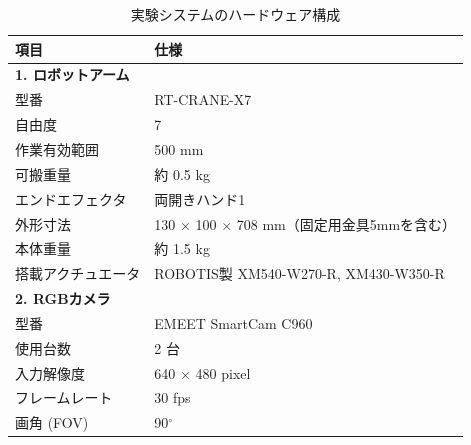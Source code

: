 \begin{table}[htbp]
    \centering
    \caption{実験システムのハードウェア構成}
    \label{tab:system_specs}
    \begin{tabular}{ll}
        \hline
        \textbf{項目} & \textbf{仕様} \\
        \hline
        \multicolumn{2}{l}{\textbf{1. ロボットアーム}} \\
        型番 & RT-CRANE-X7 \\
        自由度 & 7 \\
        作業有効範囲 & 500 mm \\
        可搬重量 & 約 0.5 kg \\
        エンドエフェクタ & 両開きハンド1 \\
        外形寸法 & 130 $\times$ 100 $\times$ 708 mm（固定用金具5mmを含む） \\
        本体重量 & 約 1.5 kg \\
        搭載アクチュエータ & ROBOTIS製 XM540-W270-R, XM430-W350-R \\
        \hline
        \multicolumn{2}{l}{\textbf{2. RGBカメラ}} \\
        型番 & EMEET SmartCam C960 \\
        使用台数 & 2 台 \\
        入力解像度 & 640 $\times$ 480 pixel \\
        フレームレート & 30 fps \\
        画角 (FOV) & 90$^\circ$ \\
        \hline
    \end{tabular}
\end{table}





